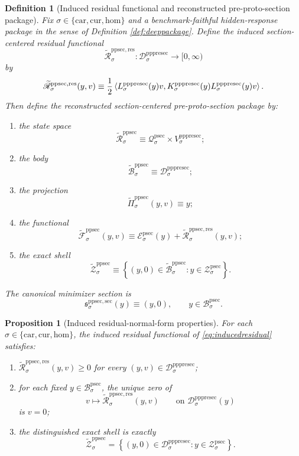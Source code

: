 \documentclass[11pt]{article}
\newcommand{\Car}{\mathrm{car}}
\newcommand{\Cur}{\mathrm{cur}}
\newcommand{\Hom}{\mathrm{hom}}
\newcommand{\ProtoSectionState}[1]{\mathcal Q_{#1}^{\mathrm{psec}}}
\newcommand{\ProtoSectionBody}[1]{\mathcal B_{#1}^{\mathrm{psec}}}
\newcommand{\ProtoSectionFunctional}[1]{\mathscr E_{#1}^{\mathrm{psec}}}
\newcommand{\ProtoSectionShell}[1]{\mathcal Z_{#1}^{\mathrm{psec}}}
\newcommand{\PreProtoSectionMinSection}[1]{\mathfrak s_{#1}^{\mathrm{ppsec,sec}}}
\newcommand{\PrePreProtoSectionVertical}[1]{V_{#1}^{\mathrm{pppresec}}}
\newcommand{\PrePreProtoSectionResidualBody}[1]{\mathcal D_{#1}^{\mathrm{pppresec}}}
\newcommand{\PrePreProtoSectionResponseMap}[1]{L_{#1}^{\mathrm{pppresec}}}
\newcommand{\PrePreProtoSectionOperator}[1]{K_{#1}^{\mathrm{pppresec}}}
\newcommand{\InducedResidualFunctional}[1]{\widetilde{\mathscr R}_{#1}^{\mathrm{ppsec,res}}}
\newcommand{\InducedPreProtoSectionState}[1]{\widetilde{\mathcal R}_{#1}^{\mathrm{ppsec}}}
\newcommand{\InducedPreProtoSectionBody}[1]{\widetilde{\mathcal B}_{#1}^{\mathrm{ppsec}}}
\newcommand{\InducedPreProtoSectionProj}[1]{\widetilde{\Pi}_{#1}^{\mathrm{ppsec}}}
\newcommand{\InducedPreProtoSectionFunctional}[1]{\widetilde{\mathscr F}_{#1}^{\mathrm{ppsec}}}
\newcommand{\InducedPreProtoSectionShell}[1]{\widetilde{\mathcal Z}_{#1}^{\mathrm{ppsec}}}
\newtheorem{definition}{Definition}
\newtheorem{proposition}{Proposition}
\begin{document}
\begin{definition}[Induced residual functional and reconstructed pre-proto-section package]
\label{def:induced}
Fix \(\sigma\in\{\Car,\Cur,\Hom\}\) and a benchmark-faithful hidden-response package in the sense of Definition \ref{def:deeppackage}. Define the induced section-centered residual functional
\[
\InducedResidualFunctional{\sigma}:
\PrePreProtoSectionResidualBody{\sigma}\to[0,\infty)
\]
by
\begin{equation}
\InducedResidualFunctional{\sigma}(y,v)
\equiv
\frac{1}{2}
\ev{
\PrePreProtoSectionResponseMap{\sigma}(y)v,
\PrePreProtoSectionOperator{\sigma}(y)
\PrePreProtoSectionResponseMap{\sigma}(y)v
}.
\label{eq:inducedresidual}
\end{equation}
Then define the reconstructed section-centered pre-proto-section package by:
\begin{enumerate}
    \item the state space
    \[
    \InducedPreProtoSectionState{\sigma}
    \equiv
    \ProtoSectionState{\sigma}\times\PrePreProtoSectionVertical{\sigma};
    \]
    \item the body
    \[
    \InducedPreProtoSectionBody{\sigma}
    \equiv
    \PrePreProtoSectionResidualBody{\sigma};
    \]
    \item the projection
    \[
    \InducedPreProtoSectionProj{\sigma}(y,v)\equiv y;
    \]
    \item the functional
    \[
    \InducedPreProtoSectionFunctional{\sigma}(y,v)
    \equiv
    \ProtoSectionFunctional{\sigma}(y)
    +
    \InducedResidualFunctional{\sigma}(y,v);
    \]
    \item the exact shell
    \[
    \InducedPreProtoSectionShell{\sigma}
    \equiv
    \left\{
    (y,0)\in\InducedPreProtoSectionBody{\sigma}:y\in\ProtoSectionShell{\sigma}
    \right\}.
    \]
\end{enumerate}
The canonical minimizer section is
\[
\PreProtoSectionMinSection{\sigma}(y)\equiv (y,0),
\qquad
y\in\ProtoSectionBody{\sigma}.
\]
\end{definition}

\begin{proposition}[Induced residual-normal-form properties]
\label{prop:residual}
For each \(\sigma\in\{\Car,\Cur,\Hom\}\), the induced residual functional of \eqref{eq:inducedresidual} satisfies:
\begin{enumerate}
    \item \(\InducedResidualFunctional{\sigma}(y,v)\ge 0\) for every \((y,v)\in\PrePreProtoSectionResidualBody{\sigma}\);
    \item for each fixed \(y\in\ProtoSectionBody{\sigma}\), the unique zero of
    \[
    v\mapsto \InducedResidualFunctional{\sigma}(y,v)
    \qquad
    \text{on }
    \PrePreProtoSectionResidualBody{\sigma}(y)
    \]
    is \(v=0\);
    \item the distinguished exact shell is exactly
    \[
    \InducedPreProtoSectionShell{\sigma}
    =
    \left\{
    (y,0)\in\PrePreProtoSectionResidualBody{\sigma}:y\in\ProtoSectionShell{\sigma}
    \right\}.
    \]
\end{enumerate}
\end{proposition}
\end{document}
